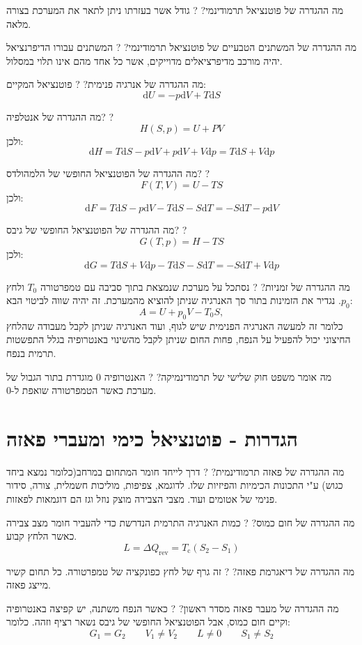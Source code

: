 \documentclass{tstextbook}
\begin{document}
מה ההגדרה של פוטנציאל תרמודינמי?
?
גודל אשר בעזרתו ניתן לתאר את המערכת בצורה מלאה.

מה ההגדרה של המשתנים הטבעיים של פוטנציאל תרמודינמי?
?
המשתנים עבורו הדיפרנציאל יהיה מורכב מדיפרציאלים מדוייקים, אשר כל אחד מהם אינו תלוי במסלול.

מה ההגדרה של אנרגיה פנימית?
?
פוטנציאל  המקיים:
$$\mathrm{d}U=-p\mathrm{d}V+T\mathrm{d}S$$

מה ההגדרה של אנטלפיה?
?
$$H(S,p)=U+PV$$
ולכן:
$$\mathrm{d}H=T\mathrm{d}S-p\mathrm{d}V+p\mathrm{d}V+V\mathrm{d}p=T\mathrm{d}S+V\mathrm{d}p$$

מה ההגדרה של הפוטנציאל החופשי של הלמהולדס?
?
$$F(T,V)=U-TS$$
ולכן:
$$\mathrm{d}F=T\mathrm{d}S-p\mathrm{d}V-T\mathrm{d}S-S\mathrm{d}T=-S\mathrm{d}T-p\mathrm{d}V$$

מה ההגדרה של הפוטנציאל החופשי של גיבס?
?
$$G(T,p)=H-TS$$
ולכן:
$$\mathrm{d}G=T\mathrm{d}S+V\mathrm{d}p-T\mathrm{d}S-S\mathrm{d}T=-S\mathrm{d}T+V\mathrm{d}p$$

מה ההגדרה של זמניות?
?
נסתכל על מערכת שנמצאת בתוך סביבה עם טמפרטורה \(T_{0}\) ולחץ \(p_{0}\). נגדיר את הזמינות בתור סך האנרגיה שניתן להוציא מהמערכת. זה יהיה שווה לביטוי הבא:
$$
A=U+p_{0}V-T_{0}S,$$
כלומר זה למעשה האנרגיה הפנימית שיש לגוף, ועוד האנרגיה שניתן לקבל מעבודה שהלחץ החיצוני יכול להפעיל על הנפח, פחות החום שניתן לקבל מהשינוי באנטרופיה בגלל התפשטות תרמית בנפח.

מה אומר משפט חוק שלישי של תרמודינמיקה?
?
האנטרופיה 0 מוגדרת בתור הגבול של מערכת כאשר הטמפרטורה שואפת ל-0.

\section{הגדרות - פוטנציאל כימי ומעברי פאזה}

מה ההגדרה של פאזה תרמודינמית?
?
דרך לייחד חומר המתחום במרחב(כלומר נמצא ביחד כגוש) ע"י התכונות הכימיות והפיזיות שלו. לדוגמא, צפיפות, מוליכות חשמלית, צורה, סידור פנימי של אטומים ועוד. מצבי הצבירה מוצק נוזל וגז הם דוגמאות לפאזות.

מה ההגדרה של חום כמוס?
?
כמות האנרגיה התרמית הנדרשת כדי להעביר חומר מצב צבירה כאשר הלחץ קבוע.
$${L}=\Delta Q_{\mathrm{rev}}=T_{\mathrm{c}}(S_{2}-S_{1})$$

מה ההגדרה של דיאגרמת פאזה?
?
זה גרף של לחץ כפונקציה של טמפרטורה. כל תחום קשיר מייצג פאזה.

מה ההגדרה של מעבר פאזה מסדר ראשון?
?
כאשר הנפח משתנה, יש קפיצה באנטרופיה וקיים חום כמוס, אבל הפוטנציאל החופשי של גיבס נשאר רציף וזהה. כלומר:
$$G_{1}=G_{2}\qquad V_{1}\neq V_{2}\qquad L\neq 0\qquad S_{1}\neq S_{2}$$
\end{document}
